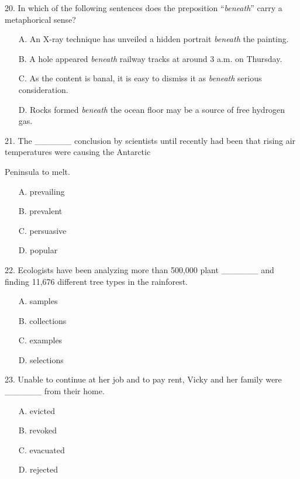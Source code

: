 \documentclass[UTF8,11pt]{ctexart}
\begin{document}
20. In which of the following sentences does the preposition “\textit{beneath}” carry a metaphorical sense?


\begin{itemize}[leftmargin=2em,itemsep=.2em,topsep=.4em]\item[A.] An X-ray technique has unveiled a hidden portrait \textit{beneath} the painting.
\item[B.] A hole appeared \textit{beneath} railway tracks at around 3 a.m. on Thursday.
\item[C.] As the content is banal, it is easy to dismiss it as \textit{beneath} serious consideration.
\item[D.] Rocks formed \textit{beneath} the ocean floor may be a source of free hydrogen gas.
\end{itemize}

21. The \_\_\_\_\_\_ conclusion by scientists until recently had been that rising air temperatures were causing the Antarctic


Peninsula to melt.


\begin{itemize}[leftmargin=2em,itemsep=.2em,topsep=.4em]\item[A.] prevailing
\item[B.] prevalent
\item[C.] persuasive
\item[D.] popular
\end{itemize}

22. Ecologists have been analyzing more than 500,000 plant \_\_\_\_\_\_ and finding 11,676 different tree types in the rainforest.


\begin{itemize}[leftmargin=2em,itemsep=.2em,topsep=.4em]\item[A.] samples
\item[B.] collections
\item[C.] examples
\item[D.] selections
\end{itemize}

23. Unable to continue at her job and to pay rent, Vicky and her family were \_\_\_\_\_\_ from their home.


\begin{itemize}[leftmargin=2em,itemsep=.2em,topsep=.4em]\item[A.] evicted
\item[B.] revoked
\item[C.] evacuated
\item[D.] rejected
\end{itemize}
\end{document}
